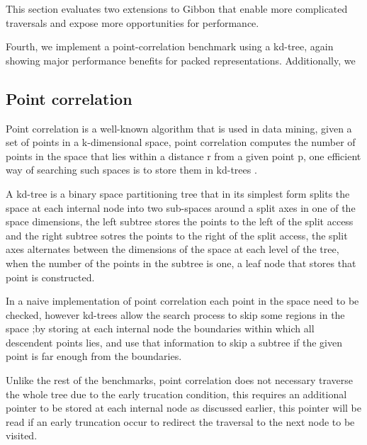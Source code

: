 \documentclass[a4paper,english]{lipics-v2016}
\newcommand{\treelang}{Gibbon\xspace} %
\begin{document}
This section evaluates two extensions to \treelang{} that enable more complicated traversals and expose more opportunities for performance.

Fourth, we
implement a point-correlation benchmark using a kd-tree, again showing
major performance benefits for packed representations. Additionally,
we 


\subsection{Point correlation} \label{sec:eval-kdtree}
Point correlation  is a well-known algorithm that is used in data mining\cite{gray2000n},
given a set of points in a k-dimensional space, point correlation computes the number of points in the space  that lies within a
distance r from a given point p, one efficient way of searching such spaces is to store them in  kd-trees \cite{gray2000n}. 

A kd-tree is a binary space partitioning tree that in its simplest form  splits the space at each internal node into two sub-spaces
around a split axes in one of the space dimensions, the left subtree stores the points to the left of the split access
and the right subtree sotres the points to the right of the split access, the split axes alternates between the dimensions of
the space at each level of the tree, when the number of the points in the subtree is one, a leaf node that stores
that point is constructed.


In a naive implementation of point correlation each point in the space need to be checked, however kd-trees 
allow the search process to skip some regions in the space ;by storing at each internal node the boundaries within which all descendent points lies,
and use that information to skip a subtree if the given point is far enough from the boundaries.

Unlike the rest of the benchmarks, point correlation does not necessary traverse the whole tree due to the early trucation condition,
this requires an additional pointer to be stored at each internal node  as discussed earlier, this pointer will be read if an early truncation occur to redirect the traversal to the
next node to be visited.
\end{document}

